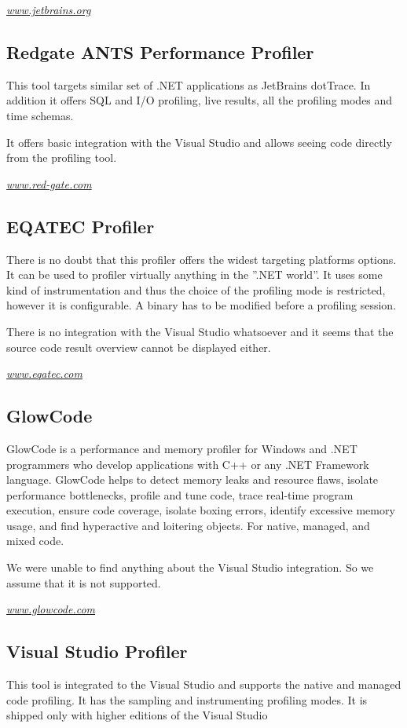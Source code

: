 \textit{\href{http://www.jetbrains.org}{www.jetbrains.org}	}

\subsection{Redgate ANTS Performance Profiler}
This tool targets similar set of .NET applications as JetBrains dotTrace. In addition it offers SQL and I/O  profiling, live results, all the profiling modes and time schemas. 

It offers basic integration with the Visual Studio and allows seeing code directly from the profiling tool. 

\textit{\href{http://www.red-gate.com}{www.red-gate.com}}

\subsection{EQATEC Profiler}
There is no doubt that this profiler offers the widest targeting platforms options. It can be used to profiler virtually anything in the ''.NET world''. It uses some kind of instrumentation and thus the choice of the profiling mode is restricted, however it is configurable. A binary has to be modified before a profiling session.

There is no integration with the Visual Studio whatsoever and it seems that the source code result overview cannot be displayed either.

\textit{\href{http://www.eqatec.com}{www.eqatec.com}}

\subsection{GlowCode}
GlowCode is a performance and memory profiler for Windows and .NET programmers who develop applications with C++ or any .NET Framework language. GlowCode helps to detect memory leaks and resource flaws, isolate performance bottlenecks, profile and tune code, trace real-time program execution, ensure code coverage, isolate boxing errors, identify excessive memory usage, and find hyperactive and loitering objects. For native, managed, and mixed code. \cite{01GlowCodeWeb} 

We were unable to find anything about the Visual Studio integration. So we assume that it is not supported.


\textit{\href{http://www.glowcode.com/}{www.glowcode.com}}

\subsection{Visual Studio Profiler}
This tool is integrated to the Visual Studio and supports the native and managed code profiling. It has the sampling and instrumenting profiling modes. It is shipped only with higher editions of the Visual Studio

